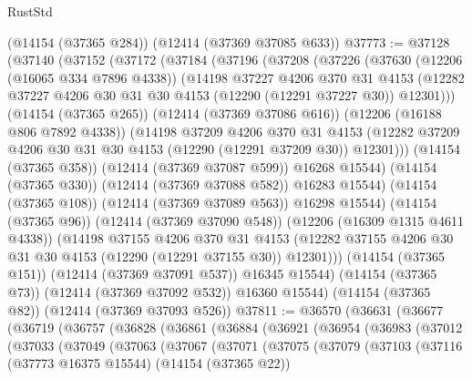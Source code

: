 \begin{lexlean}{RustStd}
\begin{coremodule}
    (@14154 (@37365 @284))
    (@12414 (@37369 @37085 @633))
@37773 := @37128
    (@37140
      (@37152
        (@37172
          (@37184
            (@37196
              (@37208
                (@37226
                  (@37630
                    (@12206 (@16065 @334 @7896 @4338))
                    (@14198
                      @37227
                      @4206
                      @370
                      @31
                      @4153
                      (@12282 @37227 @4206 @30 @31 @30 @4153 (@12290 (@12291 @37227 @30)) @12301)))
                  (@14154 (@37365 @265))
                  (@12414 (@37369 @37086 @616))
                  (@12206 (@16188 @806 @7892 @4338))
                  (@14198
                    @37209
                    @4206
                    @370
                    @31
                    @4153
                    (@12282 @37209 @4206 @30 @31 @30 @4153 (@12290 (@12291 @37209 @30)) @12301)))
                (@14154 (@37365 @358))
                (@12414 (@37369 @37087 @599))
                @16268
                @15544)
              (@14154 (@37365 @330))
              (@12414 (@37369 @37088 @582))
              @16283
              @15544)
            (@14154 (@37365 @108))
            (@12414 (@37369 @37089 @563))
            @16298
            @15544)
          (@14154 (@37365 @96))
          (@12414 (@37369 @37090 @548))
          (@12206 (@16309 @1315 @4611 @4338))
          (@14198
            @37155
            @4206
            @370
            @31
            @4153
            (@12282 @37155 @4206 @30 @31 @30 @4153 (@12290 (@12291 @37155 @30)) @12301)))
        (@14154 (@37365 @151))
        (@12414 (@37369 @37091 @537))
        @16345
        @15544)
      (@14154 (@37365 @73))
      (@12414 (@37369 @37092 @532))
      @16360
      @15544)
    (@14154 (@37365 @82))
    (@12414 (@37369 @37093 @526))
@37811 := @36570
    (@36631
      (@36677
        (@36719
          (@36757
            (@36828
              (@36861
                (@36884
                  (@36921
                    (@36954
                      (@36983
                        (@37012
                          (@37033
                            (@37049
                              (@37063
                                (@37067
                                  (@37071
                                    (@37075
                                      (@37079
                                        (@37103
                                          (@37116
                                            (@37773 @16375 @15544)
                                            (@14154 (@37365 @22))

\end{coremodule}
\end{lexlean}
